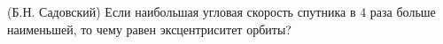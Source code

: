 (Б.Н. Садовский)
Если наибольшая угловая скорость спутника в $4$ раза больше наименьшей,
то чему равен эксцентриситет орбиты?
